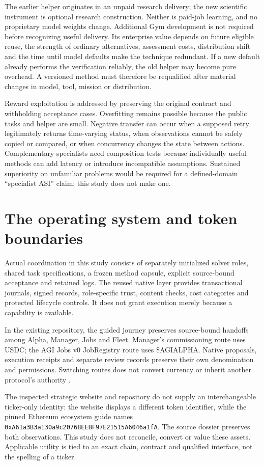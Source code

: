 \documentclass[11pt,letterpaper]{article}
\begin{document}
The earlier helper originates in an unpaid research delivery; the new scientific instrument is optional research construction. Neither is paid-job learning, and no proprietary model weights change. Additional Gym development is not required before recognizing useful delivery. Its enterprise value depends on future eligible reuse, the strength of ordinary alternatives, assessment costs, distribution shift and the time until model defaults make the technique redundant. If a new default already performs the verification reliably, the old helper may become pure overhead. A versioned method must therefore be requalified after material changes in model, tool, mission or distribution.

Reward exploitation is addressed by preserving the original contract and withholding acceptance cases. Overfitting remains possible because the public tasks and helper are small. Negative transfer can occur when a supposed retry legitimately returns time-varying status, when observations cannot be safely copied or compared, or when concurrency changes the state between actions. Complementary specialists need composition tests because individually useful methods can add latency or introduce incompatible assumptions. Sustained superiority on unfamiliar problems would be required for a defined-domain ``specialist ASI'' claim; this study does not make one.

\section{The operating system and token boundaries}
Actual coordination in this study consists of separately initialized solver roles, shared task specifications, a frozen method capsule, explicit source-bound acceptance and retained logs. The reused native layer provides transactional journals, signed records, role-specific trust, content checks, cost categories and protected lifecycle controls. It does not grant execution merely because a capability is available.

In the existing repository, the guided journey preserves source-bound handoffs among Alpha, Manager, Jobs and Fleet. Manager's commissioning route uses USDC; the AGI Jobs v0 JobRegistry route uses \$AGIALPHA. Native proposals, execution receipts and separate review records preserve their own denomination and permissions. Switching routes does not convert currency or inherit another protocol's authority \cite{journey}.

The inspected strategic website and repository do not supply an interchangeable ticker-only identity: the website displays a different token identifier, while the pinned Ethereum ecosystem guide names \texttt{0xA61a3B3a130a9c20768EEBF97E21515A6046a1fA}. The source dossier preserves both observations. This study does not reconcile, convert or value these assets. Applicable utility is tied to an exact chain, contract and qualified interface, not the spelling of a ticker.
\end{document}

